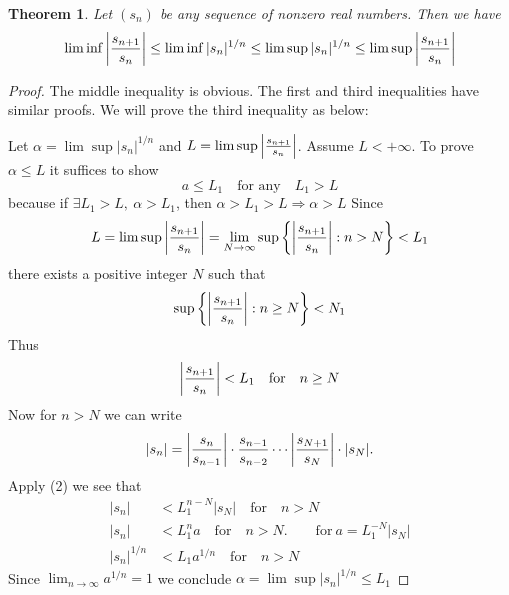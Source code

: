 \documentclass[12pt, lettersize]{book}
\newtheorem{thm}{Theorem}[section]
\begin{document}
		\setcounter{equation}{0}
		\begin{thm}\label{thm:12.2}
		Let $(s_n)$ be any sequence of nonzero real numbers. Then we have
		\begin{displaymath}
			\lim\inf\abs{\frac{s_{n+1}}{s_n}}\leq\lim\inf|s_n|^{1/n}\leq\lim\sup|s_n|^{1/n}\leq\lim\sup\abs{\frac{s_{n+1}}{s_n}}
		\end{displaymath}
		\end{thm}
		\begin{proof}
			The middle inequality is obvious. The first and third inequalities have similar proofs. We will prove the third
			inequality as below:
			
			Let $\alpha=\lim\sup|s_n|^{1/n}$ and $L=\lim\sup\abs{\frac{s_{n+1}}{s_n}}$. Assume $L<+\infty$. To prove $\alpha\leq L$ it suffices to show
			\begin{equation}
				a\leq L_1\quad\text{for any}\quad L_1>L
			\end{equation}
			because if $\exists L_1>L,\ \alpha>L_1$, then $\alpha>L_1>L\Rightarrow\alpha>L$
			Since
			\begin{displaymath}
				L=\lim\sup\abs{\frac{s_{n+1}}{s_n}}=\lim\limits_{N\rightarrow\infty}\sup \left\{ \abs{\frac{s_{n+1}}{s_n}}: n>N \right\} <L_1
			\end{displaymath}
			there exists a positive integer $N$ such that
			\begin{displaymath}
				\sup\left\{\abs{\frac{s_{n+1}}{s_n}}: n\geq N\right\}<N_1
			\end{displaymath}
			Thus
			\begin{equation}
				\abs{\frac{s_{n+1}}{s_n}}<L_1\quad\text{for}\quad n\geq N
			\end{equation}
			Now for $n>N$ we can write
			\begin{displaymath}
				|s_n|=\abs{\frac{s_n}{s_{n-1}}}\cdot\frac{s_{n-1}}{s_{n-2}}\cdots\abs{\frac{s_{N+1}}{s_N}}\cdot|s_N|.
			\end{displaymath}
			Apply (2) we see that
			\begin{align*}
				|s_n|&<L_1^{n-N}|s_N|\quad\text{for}\quad n>N\\
				|s_n|&<L_1^na\quad\text{for}\quad n>N.\qquad \text{for}\ a=L_1^{-N}|s_N|\\
				|s_n|^{1/n}&<L_1a^{1/n}\quad\text{for}\quad n>N
			\end{align*}
			Since $\lim_{n\rightarrow\infty}a^{1/n}=1$ we conclude $\alpha=\lim\sup|s_n|^{1/n}\leq L_1$
		\end{proof}
		
\end{document}
